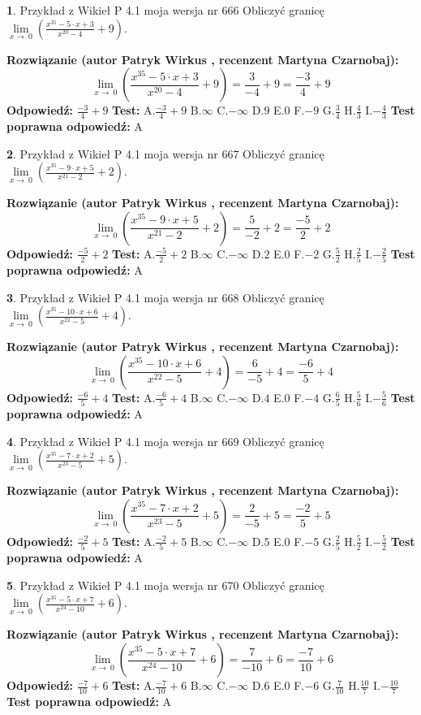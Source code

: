 \documentclass[12pt, a4paper]{article}
\theoremstyle{definition} %
\newtheorem{zad}{}
\newcommand{\zadStart}[1]{\begin{zad}#1\newline}
\newcommand{\zadStop}{\end{zad}}
\newcommand{\rozwStart}[2]{\noindent \textbf{Rozwiązanie (autor #1 , recenzent #2): }\newline}
\newcommand{\rozwStop}{\newline}
\newcommand{\odpStart}{\noindent \textbf{Odpowiedź:}\newline}
\newcommand{\odpStop}{\newline}
\newcommand{\testStart}{\noindent \textbf{Test:}\newline}
\newcommand{\testStop}{\newline}
\newcommand{\kluczStart}{\noindent \textbf{Test poprawna odpowiedź:}\newline}
\newcommand{\kluczStop}{\newline}
\begin{document}
\zadStart{Przykład z Wikieł P 4.1 moja wersja nr 666}
Obliczyć granicę $\lim\limits_{x\to\ 0}(\frac{x^{35}-5 \cdot x +3}{x^{20}-4}+9)$.
\zadStop
\rozwStart{Patryk Wirkus}{Martyna Czarnobaj}
$$\lim\limits_{x\to\ 0}(\frac{x^{35}-5 \cdot x +3}{x^{20}-4}+9)=\frac{3}{-4}+9=\frac{-3}{4}+9$$
\rozwStop
\odpStart
$\frac{-3}{4}+9$
\odpStop
\testStart
A.$\frac{-3}{4}+9$
B.$\infty$
C.$-\infty$
D.$9$
E.$0$
F.$-9$
G.$\frac{3}{4}$
H.$\frac{4}{3}$
I.$-\frac{4}{3}$
\testStop
\kluczStart
A
\kluczStop



\zadStart{Przykład z Wikieł P 4.1 moja wersja nr 667}
Obliczyć granicę $\lim\limits_{x\to\ 0}(\frac{x^{35}-9 \cdot x +5}{x^{21}-2}+2)$.
\zadStop
\rozwStart{Patryk Wirkus}{Martyna Czarnobaj}
$$\lim\limits_{x\to\ 0}(\frac{x^{35}-9 \cdot x +5}{x^{21}-2}+2)=\frac{5}{-2}+2=\frac{-5}{2}+2$$
\rozwStop
\odpStart
$\frac{-5}{2}+2$
\odpStop
\testStart
A.$\frac{-5}{2}+2$
B.$\infty$
C.$-\infty$
D.$2$
E.$0$
F.$-2$
G.$\frac{5}{2}$
H.$\frac{2}{5}$
I.$-\frac{2}{5}$
\testStop
\kluczStart
A
\kluczStop



\zadStart{Przykład z Wikieł P 4.1 moja wersja nr 668}
Obliczyć granicę $\lim\limits_{x\to\ 0}(\frac{x^{35}-10 \cdot x +6}{x^{22}-5}+4)$.
\zadStop
\rozwStart{Patryk Wirkus}{Martyna Czarnobaj}
$$\lim\limits_{x\to\ 0}(\frac{x^{35}-10 \cdot x +6}{x^{22}-5}+4)=\frac{6}{-5}+4=\frac{-6}{5}+4$$
\rozwStop
\odpStart
$\frac{-6}{5}+4$
\odpStop
\testStart
A.$\frac{-6}{5}+4$
B.$\infty$
C.$-\infty$
D.$4$
E.$0$
F.$-4$
G.$\frac{6}{5}$
H.$\frac{5}{6}$
I.$-\frac{5}{6}$
\testStop
\kluczStart
A
\kluczStop



\zadStart{Przykład z Wikieł P 4.1 moja wersja nr 669}
Obliczyć granicę $\lim\limits_{x\to\ 0}(\frac{x^{35}-7 \cdot x +2}{x^{23}-5}+5)$.
\zadStop
\rozwStart{Patryk Wirkus}{Martyna Czarnobaj}
$$\lim\limits_{x\to\ 0}(\frac{x^{35}-7 \cdot x +2}{x^{23}-5}+5)=\frac{2}{-5}+5=\frac{-2}{5}+5$$
\rozwStop
\odpStart
$\frac{-2}{5}+5$
\odpStop
\testStart
A.$\frac{-2}{5}+5$
B.$\infty$
C.$-\infty$
D.$5$
E.$0$
F.$-5$
G.$\frac{2}{5}$
H.$\frac{5}{2}$
I.$-\frac{5}{2}$
\testStop
\kluczStart
A
\kluczStop



\zadStart{Przykład z Wikieł P 4.1 moja wersja nr 670}
Obliczyć granicę $\lim\limits_{x\to\ 0}(\frac{x^{35}-5 \cdot x +7}{x^{24}-10}+6)$.
\zadStop
\rozwStart{Patryk Wirkus}{Martyna Czarnobaj}
$$\lim\limits_{x\to\ 0}(\frac{x^{35}-5 \cdot x +7}{x^{24}-10}+6)=\frac{7}{-10}+6=\frac{-7}{10}+6$$
\rozwStop
\odpStart
$\frac{-7}{10}+6$
\odpStop
\testStart
A.$\frac{-7}{10}+6$
B.$\infty$
C.$-\infty$
D.$6$
E.$0$
F.$-6$
G.$\frac{7}{10}$
H.$\frac{10}{7}$
I.$-\frac{10}{7}$
\testStop
\kluczStart
A
\kluczStop
\end{document}
